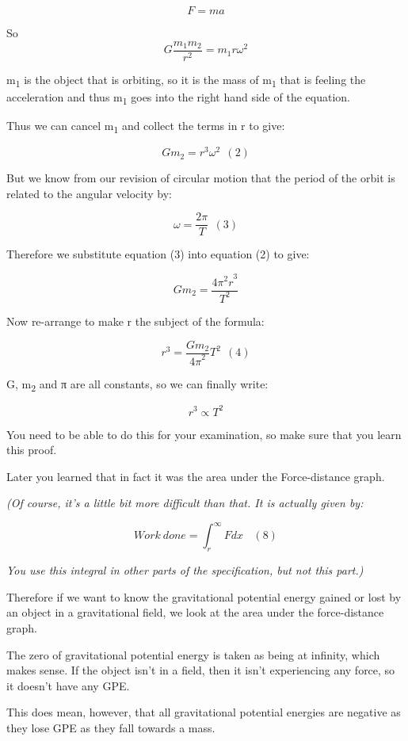 \documentclass[main.tex]{subfiles}
\begin{document}
\[F = ma\]

So \[G\frac{m_{1}m_{2}}{r^{2}} = m_{1}r\omega^{2}\]

m\textsubscript{1} is the object that is orbiting, so it is the mass of
m\textsubscript{1} that is feeling the acceleration and thus
m\textsubscript{1} goes into the right hand side of the equation.

Thus we can cancel m\textsubscript{1} and collect the terms in r to
give:

\[Gm_{2} = r^{3}\omega^{2}\ \ (2)\]

But we know from our revision of circular motion that the period of the
orbit is related to the angular velocity by:

\[\omega = \frac{2\pi}{T}\ \ (3)\]

Therefore we substitute equation (3) into equation (2) to give:

\[Gm_{2} = \frac{{4\pi^{2}r}^{3}}{T^{2}}\]

Now re-arrange to make r the subject of the formula:

\[r^{3} = \frac{Gm_{2}}{{4\pi}^{2}}T^{2}\ \ (4)\]

G, m\textsubscript{2} and π are all constants, so we can finally write:

\[r^{3} \propto T^{2}\]

You need to be able to do this for your examination, so make sure that
you learn this proof.


Later you learned that in fact it was the area under the Force-distance
graph.

\emph{(Of course, it's a little bit more difficult than that. It is
actually given by:}

\[Work\ done = \int_{r}^{\infty}{F{dx\ \ \ \ (8)}}\]

\emph{You use this integral in other parts of the specification, but not
this part.)}

Therefore if we want to know the gravitational potential energy gained
or lost by an object in a gravitational field, we look at the area under
the force-distance graph.

The zero of gravitational potential energy is taken as being at
infinity, which makes sense. If the object isn't in a field, then it
isn't experiencing any force, so it doesn't have any GPE.

This does mean, however, that all gravitational potential energies are
negative as they lose GPE as they fall towards a mass.
\end{document}

